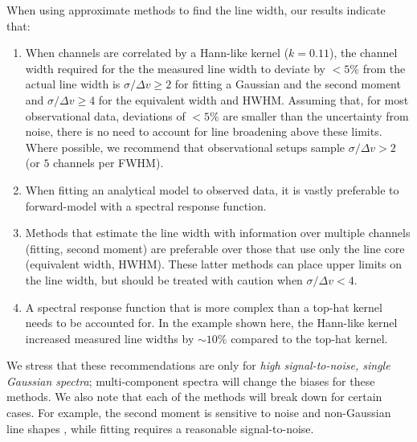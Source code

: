 \documentclass{rnaastex}
\begin{document}


When using approximate methods to find the line width, our results indicate that: 
\begin{enumerate}
    \item When channels are correlated by a Hann-like kernel ($k=0.11$), the channel width required for the the measured line width to deviate by $<5\%$ from the actual line width is $\sigma / \Delta v \geq 2$ for fitting a Gaussian and the second moment and $\sigma / \Delta v \geq 4$ for the equivalent width and HWHM.  Assuming that, for most observational data, deviations of $<5\%$ are smaller than the uncertainty from noise, there is no need to account for line broadening above these limits.  Where possible, we recommend that observational setups sample $\sigma / \Delta v > 2$ (or $5$ channels per FWHM).
    \item When fitting an analytical model to observed data, it is vastly preferable to forward-model with a spectral response function.
    \item Methods that estimate the line width with information over multiple channels (fitting, second moment) are preferable over those that use only the line core (equivalent width, HWHM). These latter methods can place upper limits on the line width, but should be treated with caution when $\sigma / \Delta v <4$.
    \item A spectral response function that is more complex than a top-hat kernel needs to be accounted for.  In the example shown here, the Hann-like kernel increased measured line widths by $\sim10\%$ compared to the top-hat kernel.
\end{enumerate}

We stress that these recommendations are only for {\it high signal-to-noise, single Gaussian spectra}; multi-component spectra will change the biases for these methods.  We also note that each of the methods will break down for certain cases. For example, the second moment is sensitive to noise and non-Gaussian line shapes \citep{koch2018}, while fitting requires a reasonable signal-to-noise.
\end{document}
